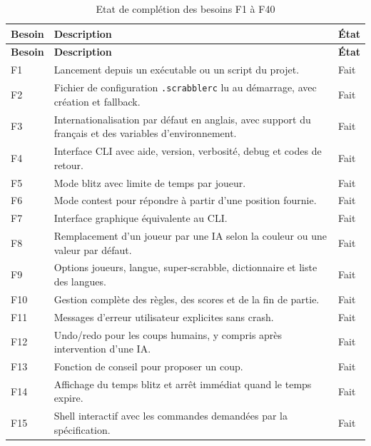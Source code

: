 \documentclass[a4paper]{article}
\begin{document}
\renewcommand{\arraystretch}{1.15}
\begin{longtable}{|p{1.3cm}|p{11.4cm}|p{1.8cm}|}
    \caption{Etat de complétion des besoins F1 à F40}\label{tab:besoins-f1-f40}\\
    \hline
    \textbf{Besoin} & \textbf{Description} & \textbf{État} \\
    \hline
    \endfirsthead

    \hline
    \textbf{Besoin} & \textbf{Description} & \textbf{État} \\
    \hline
    \endhead

    F1  & Lancement depuis un exécutable ou un script du projet. & Fait \\
    \hline
    F2  & Fichier de configuration \texttt{.scrabblerc} lu au démarrage, avec création et fallback. & Fait \\
    \hline
    F3  & Internationalisation par défaut en anglais, avec support du français et des variables d'environnement. & Fait \\
    \hline
    F4  & Interface CLI avec aide, version, verbosité, debug et codes de retour. & Fait \\
    \hline
    F5  & Mode blitz avec limite de temps par joueur. & Fait \\
    \hline
    F6  & Mode contest pour répondre à partir d'une position fournie. & Fait \\
    \hline
    F7  & Interface graphique équivalente au CLI. & Fait \\
    \hline
    F8  & Remplacement d'un joueur par une IA selon la couleur ou une valeur par défaut. & Fait \\
    \hline
    F9  & Options joueurs, langue, super-scrabble, dictionnaire et liste des langues. & Fait \\
    \hline
    F10 & Gestion complète des règles, des scores et de la fin de partie. & Fait \\
    \hline
    F11 & Messages d'erreur utilisateur explicites sans crash. & Fait \\
    \hline
    F12 & Undo/redo pour les coups humains, y compris après intervention d'une IA. & Fait \\
    \hline
    F13 & Fonction de conseil pour proposer un coup. & Fait \\
    \hline
    F14 & Affichage du temps blitz et arrêt immédiat quand le temps expire. & Fait \\
    \hline
    F15 & Shell interactif avec les commandes demandées par la spécification. & Fait \\

\end{longtable}
\end{document}
